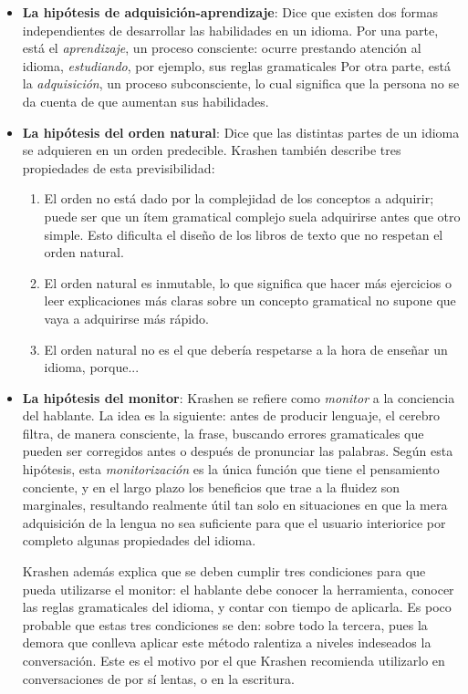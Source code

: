 \begin{itemize}
	\item \textbf{La hipótesis de adquisición-aprendizaje}: Dice que existen dos formas independientes de desarrollar las habilidades en un idioma. Por una parte, está el \textit{aprendizaje}, un proceso consciente: ocurre prestando atención al idioma, \textit{estudiando}, por ejemplo, sus reglas gramaticales Por otra parte, está la \textit{adquisición}, un proceso subconsciente, lo cual significa que la persona no se da cuenta de que aumentan sus habilidades.
	\item \textbf{La hipótesis del orden natural}: Dice que las distintas partes de un idioma se adquieren en un orden predecible. Krashen también describe tres propiedades de esta previsibilidad:
	\begin{enumerate}
		\item El orden no está dado por la complejidad de los conceptos a adquirir; puede ser que un ítem gramatical complejo suela adquirirse antes que otro simple. Esto dificulta el diseño de los libros de texto que no respetan el orden natural.
		\item El orden natural es inmutable, lo que significa que hacer más ejercicios o leer explicaciones más claras sobre un concepto gramatical no supone que vaya a adquirirse más rápido.
		\item El orden natural no es el que debería respetarse a la hora de enseñar un idioma, porque... \todo
	\end{enumerate}
	\item \textbf{La hipótesis del monitor}: Krashen se refiere como \textit{monitor} a la conciencia del hablante. La idea es la siguiente: antes de producir lenguaje, el cerebro filtra, de manera consciente, la frase, buscando errores gramaticales que pueden ser corregidos antes o después de pronunciar las palabras. Según esta hipótesis, esta \textit{monitorización} es la única función que tiene el pensamiento conciente, y en el largo plazo los beneficios que trae a la fluidez son marginales, resultando realmente útil tan solo en situaciones en que la mera adquisición de la lengua no sea suficiente para que el usuario interiorice por completo algunas propiedades del idioma.
	
	Krashen además explica que se deben cumplir tres condiciones para que pueda utilizarse el monitor: el hablante debe conocer la herramienta, conocer las reglas gramaticales del idioma, y contar con tiempo de aplicarla. Es poco probable que estas tres condiciones se den: sobre todo la tercera, pues la demora que conlleva aplicar este método ralentiza a niveles indeseados la conversación. Este es el motivo por el que Krashen recomienda utilizarlo en conversaciones de por sí lentas, o en la escritura.
	

\end{itemize}

